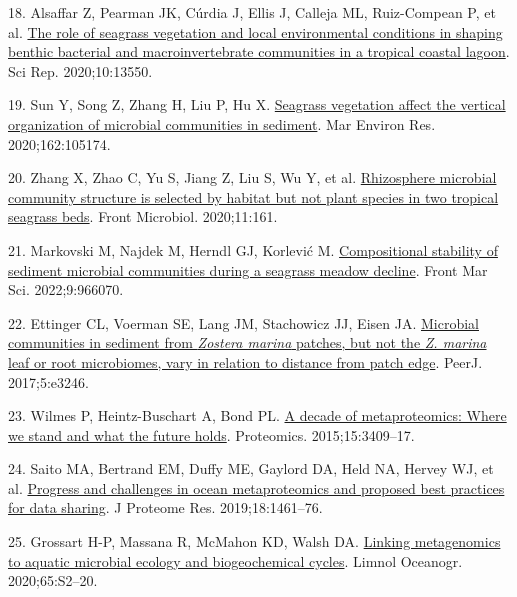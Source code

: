 \documentclass[
  12 pt,
]{article}
\newlength{\cslhangindent}
\newlength{\cslentryspacingunit} %
\newenvironment{CSLReferences}[2] %
 {%
  \setlength{\parindent}{0pt}
  \ifodd #1
  \let\oldpar\par
  \def\par{\hangindent=\cslhangindent\oldpar}
  \fi
  \setlength{\parskip}{#2\cslentryspacingunit}
 }%
 {}
\begin{document}
\begin{CSLReferences}{0}{0}
\leavevmode{}%
18. Alsaffar Z, Pearman JK, Cúrdia J, Ellis J, Calleja ML, Ruiz-Compean P, et al. \href{https://doi.org/10.1038/s41598-020-70318-1}{The role of seagrass vegetation and local environmental conditions in shaping benthic bacterial and macroinvertebrate communities in a tropical coastal lagoon}. Sci Rep. 2020;10:13550.

\leavevmode{}%
19. Sun Y, Song Z, Zhang H, Liu P, Hu X. \href{https://doi.org/10.1016/j.marenvres.2020.105174}{Seagrass vegetation affect the vertical organization of microbial communities in sediment}. Mar Environ Res. 2020;162:105174.

\leavevmode{}%
20. Zhang X, Zhao C, Yu S, Jiang Z, Liu S, Wu Y, et al. \href{https://doi.org/10.3389/fmicb.2020.00161}{Rhizosphere microbial community structure is selected by habitat but not plant species in two tropical seagrass beds}. Front Microbiol. 2020;11:161.

\leavevmode{}%
21. Markovski M, Najdek M, Herndl GJ, Korlević M. \href{https://doi.org/10.3389/fmars.2022.966070}{Compositional stability of sediment microbial communities during a seagrass meadow decline}. Front Mar Sci. 2022;9:966070.

\leavevmode{}%
22. Ettinger CL, Voerman SE, Lang JM, Stachowicz JJ, Eisen JA. \href{https://doi.org/10.7717/peerj.3246}{Microbial communities in sediment from {{\emph{Zostera marina}}} patches, but not the {{\emph{Z. marina}}} leaf or root microbiomes, vary in relation to distance from patch edge}. PeerJ. 2017;5:e3246.

\leavevmode{}%
23. Wilmes P, Heintz-Buschart A, Bond PL. \href{https://doi.org/10.1002/pmic.201500183}{A decade of metaproteomics: Where we stand and what the future holds}. Proteomics. 2015;15:3409--17.

\leavevmode{}%
24. Saito MA, Bertrand EM, Duffy ME, Gaylord DA, Held NA, Hervey WJ, et al. \href{https://doi.org/10.1021/acs.jproteome.8b00761}{Progress and challenges in ocean metaproteomics and proposed best practices for data sharing}. J Proteome Res. 2019;18:1461--76.

\leavevmode{}%
25. Grossart H-P, Massana R, McMahon KD, Walsh DA. \href{https://doi.org/10.1002/lno.11382}{Linking metagenomics to aquatic microbial ecology and biogeochemical cycles}. Limnol Oceanogr. 2020;65:S2--20.


\end{CSLReferences}
\end{document}
